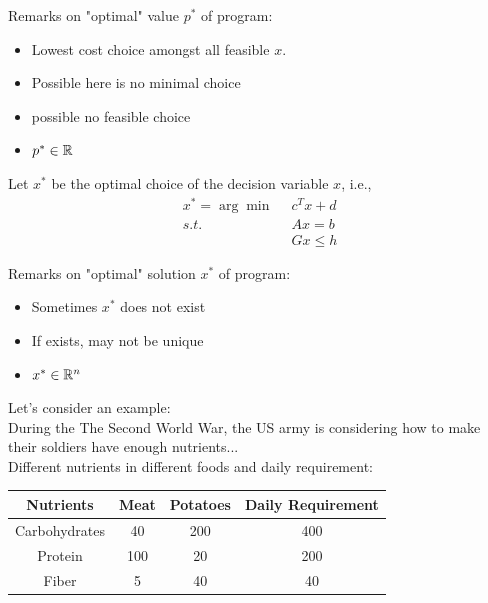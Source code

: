 Remarks on "optimal" value $p^*$ of program:
\begin{itemize}
	\item Lowest cost choice amongst all feasible $x$.
	
	\item Possible here is no minimal choice
	
	\item possible no feasible choice
	
	\item $p^*\in \mathbb{R}$
\end{itemize}

\vspace{0.5cm}
Let $x^*$ be the optimal choice of the decision variable $x$, i.e.,
\begin{align*}
	x^* = \arg \min \,\,\, &c^Tx + d\\
	s.t.\,\,\, &Ax = b\\
	&Gx\leq h
\end{align*}

Remarks on "optimal" solution $x^*$ of program:
\begin{itemize}
	\item Sometimes $x^*$ does not exist
	
	\item If exists, may not be unique
	
	\item $x^*\in \mathbb{R}^n$
\end{itemize}




\vspace{0.5cm}
Let's consider an example:\\

During the The Second World War, the US army is considering how to make their soldiers have enough nutrients...\\

Different nutrients in different foods and daily requirement:
\begin{center}
	\begin{tabular}{|c|c|c|c|}
		\hline 
		Nutrients&Meat&Potatoes&Daily Requirement\\
		\hline  
		Carbohydrates&40&200&400\\
		\hline  
		Protein&100&20&200\\
		\hline  
		Fiber&5&40&40\\
		\hline 
	\end{tabular}
\end{center}


